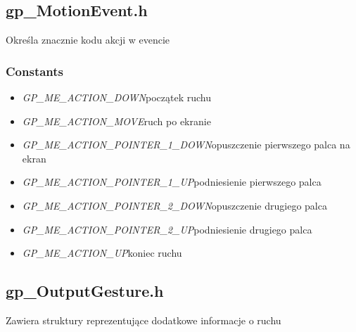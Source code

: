 \subsection{gp_MotionEvent.h}
Określa znacznie kodu akcji w evencie
\subsubsection{Constants}
\begin{itemize}
\item \textit{GP_ME_ACTION_DOWN}\qquad początek ruchu
\item \textit{GP_ME_ACTION_MOVE}\qquad ruch po ekranie
\item \textit{GP_ME_ACTION_POINTER_1_DOWN}\qquad opuszczenie pierwszego palca na ekran
\item \textit{GP_ME_ACTION_POINTER_1_UP}\qquad podniesienie pierwszego palca
\item \textit{GP_ME_ACTION_POINTER_2_DOWN}\qquad opuszczenie drugiego palca
\item \textit{GP_ME_ACTION_POINTER_2_UP}\qquad podniesienie drugiego palca
\item \textit{GP_ME_ACTION_UP}\qquad koniec ruchu
\end{itemize}

\subsection{gp_OutputGesture.h}
Zawiera struktury reprezentujące dodatkowe informacje o ruchu

